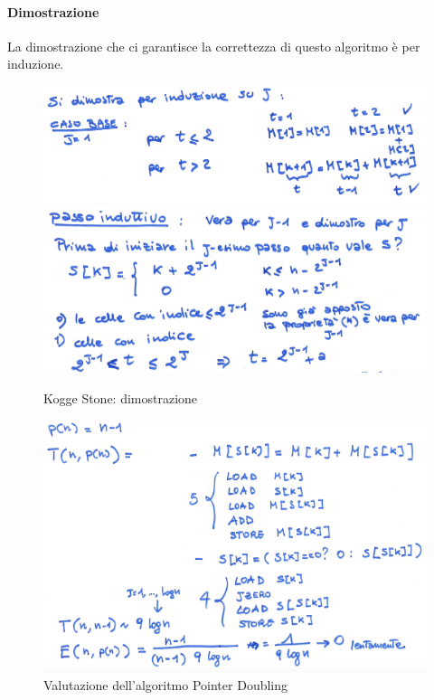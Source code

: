 \paragraph{Dimostrazione}
La dimostrazione che ci garantisce la correttezza di questo algoritmo è per induzione. 

\begin{figure}[h]
    \centering
    \includegraphics[scale=0.35]{images/dimostrazione_kogge_stone_caso_base.png}
    \includegraphics[scale=0.35]{images/dimostrazione_kogge_stone_caso_induttivo.png}
    \caption{Kogge Stone: dimostrazione}
\end{figure}

\begin{figure}[h]
    \centering
    \includegraphics[scale=0.35]{images/valutazione_kogge_stone.png}
    \caption{Valutazione dell'algoritmo Pointer Doubling}
\end{figure}

